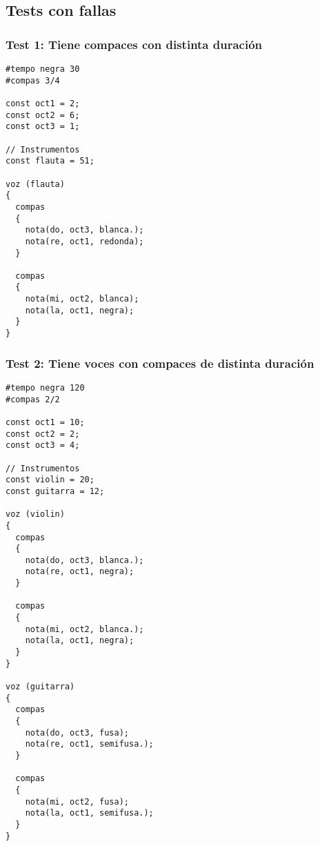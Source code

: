 
\subsection{Tests con fallas}

\subsubsection{Test 1: Tiene compaces con distinta duración}

\begin{lstlisting}
#tempo negra 30
#compas 3/4

const oct1 = 2;
const oct2 = 6;
const oct3 = 1;

// Instrumentos
const flauta = 51;

voz (flauta)
{
  compas
  {
    nota(do, oct3, blanca.);
    nota(re, oct1, redonda);
  }

  compas
  {
    nota(mi, oct2, blanca);
    nota(la, oct1, negra);
  }
}
\end{lstlisting}
\vspace{5mm}

\subsubsection{Test 2: Tiene voces con compaces de distinta duración}

\begin{lstlisting}
#tempo negra 120
#compas 2/2

const oct1 = 10;
const oct2 = 2;
const oct3 = 4;

// Instrumentos
const violin = 20;
const guitarra = 12;

voz (violin)
{
  compas
  {
    nota(do, oct3, blanca.);
    nota(re, oct1, negra);
  }

  compas
  {
    nota(mi, oct2, blanca.);
    nota(la, oct1, negra);
  }
}

voz (guitarra)
{
  compas
  {
    nota(do, oct3, fusa);
    nota(re, oct1, semifusa.);
  }

  compas
  {
    nota(mi, oct2, fusa);
    nota(la, oct1, semifusa.);
  }
}
\end{lstlisting}
\vspace{5mm}


